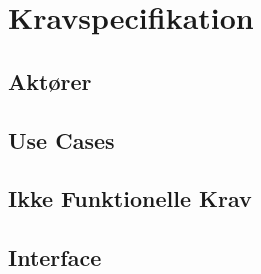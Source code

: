 
\chapter{Kravspecifikation}


\section{Aktører}


\newpage
\section{Use Cases}


\newpage
\section{Ikke Funktionelle Krav}


\newpage
\section{Interface}


